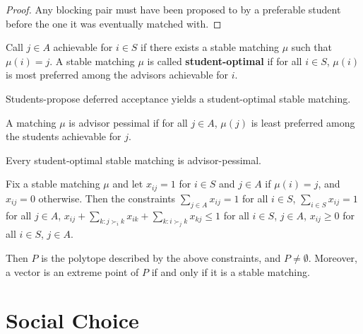 \begin{proof}
  Any blocking pair must have been proposed to by a preferable student
  before the one it was eventually matched with.
\end{proof}

\begin{thm}
  \label{sec:stable-matchings-3}
  Call $j \in A$ achievable for $i \in S$ if there exists a stable
  matching $\mu$ such that $\mu(i) = j$.  A stable matching $\mu$
  is called  \textbf{student-optimal} if for all $i \in S$, $\mu(i)$
  is most preferred among the advisors achievable for $i$.

  Students-propose deferred acceptance yields a student-optimal stable matching.
\end{thm}

\begin{thm}
  \label{sec:stable-matchings-4}
  A matching $\mu$ is advisor pessimal if for all $j \in A$, $\mu(j)$
  is least preferred among the students achievable for $j$.

  Every student-optimal stable matching is advisor-pessimal.
\end{thm}

\begin{thm}
  \label{sec:stable-matchings-5}
  Fix a stable matching $\mu$ and let $x_{ij} = 1$ for $i \in S$ and
  $j \in A$ if $\mu(i) = j$, and $x_{ij} = 0$ otherwise.  Then the
  constraints $\sum_{j \in A}^{} x_{ij} = 1$ for all $i \in S$,
  $\sum_{i \in S}^{} x_{ij} = 1$ for all $j \in A$, $x_{ij} + \sum_{k:
  j \succ_{i} k}^{} x_{ik} + \sum_{k: i \succ_{j} k}^{} x_{kj}
\leq 1$ for all $i \in S$, $j \in A$, $x_{ij} \geq 0$ for all $i \in
S$, $j \in A$.

Then $P$ is the polytope described by the above constraints, and $P
\neq \emptyset$.  Moreover, a vector is an extreme point of $P$ if and
only if it is a stable matching.
\end{thm}


\section{Social Choice}
\label{sec:social-choice}


